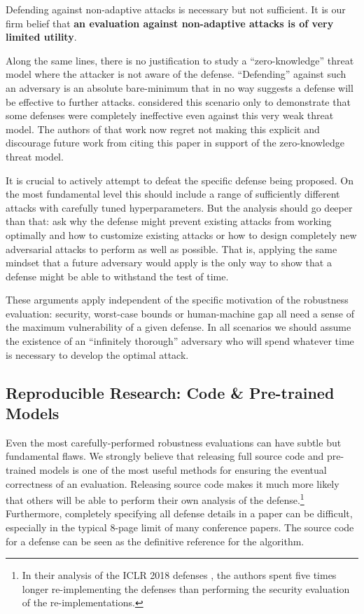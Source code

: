 \documentclass{article} %
\begin{document}
Defending against non-adaptive attacks is necessary but not sufficient.
%
It is our firm belief that \textbf{an evaluation against non-adaptive
  attacks is of very limited utility}.

Along the same lines, there is no justification to study a ``zero-knowledge''
\citep{biggio2013evasion} threat model where the attacker
is not aware of the defense.
%
``Defending'' against such an adversary is
an absolute bare-minimum that in no way suggests a defense will be effective
to further attacks. \cite{carlini2017adversarial} considered this scenario only to demonstrate
that some defenses were completely ineffective even against this very weak threat model.
%
The authors of that work now regret not making this explicit and
discourage future work from citing this paper in support of the zero-knowledge threat model.


It is crucial to actively attempt to defeat the specific defense being proposed.
%
On the most fundamental level
this should include a range of sufficiently different attacks with carefully tuned
hyperparameters.
%
But the analysis should go deeper than that:
ask why the defense might prevent existing attacks
from working optimally and how to customize existing
attacks or how to design completely new adversarial attacks to
perform as well as possible.
%
That is, applying the same mindset that a
future adversary would apply is the only way to show
that a defense might be able to withstand the test of time.

These arguments apply independent of the specific motivation of
the robustness evaluation: security, worst-case bounds
or human-machine gap all need a sense of the maximum vulnerability
of a given defense.
%
In all scenarios we should assume
the existence of an ``infinitely thorough'' adversary who will spend whatever time is
necessary to develop the optimal attack.


\subsection{Reproducible Research: Code \& Pre-trained Models}
\label{sec:releasecode}

Even the most carefully-performed robustness evaluations can have
subtle but fundamental flaws.
%
We strongly believe that releasing full source code and pre-trained models is one of the most
useful methods for ensuring the eventual correctness of an evaluation.
%
Releasing source code makes it much more likely that others will be able to
perform their own analysis of the defense.\footnote{In their analysis
  of the ICLR 2018 defenses \citep{athalye2018obfuscated}, the
  authors spent five times longer re-implementing the defenses than
  performing the security evaluation of the re-implementations.}
%
Furthermore, completely specifying all defense details in a paper can be
difficult, especially in the typical 8-page limit of many
conference papers.
%
The source code for a defense can be seen as the definitive
reference for the algorithm.
\end{document}
